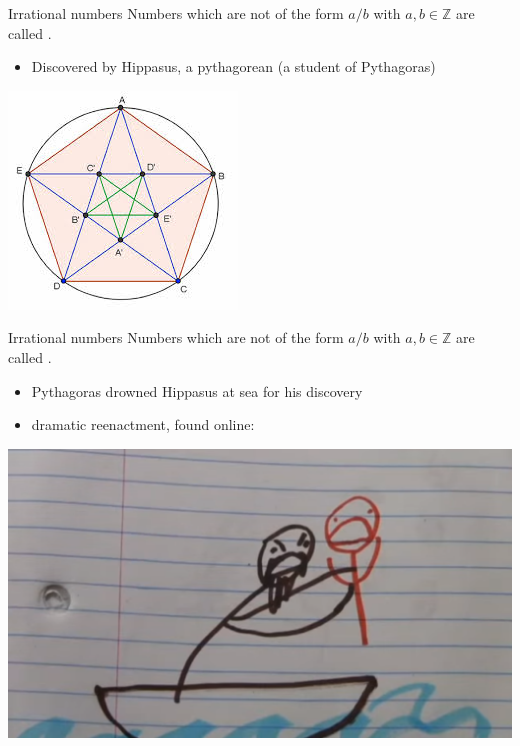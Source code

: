 \documentclass{beamer}
\begin{document}
\begin{frame}{Irrational numbers}
Numbers which are not of the form $a/b$ with $a,b\in\mathbb{Z}$ are called .\\
\begin{itemize}
\item Discovered by Hippasus, a pythagorean (a student of Pythagoras)
\end{itemize}
\begin{center}
\includegraphics[width=0.4\linewidth]{fig/pentagram}
\end{center}
\end{frame}

\begin{frame}{Irrational numbers}
Numbers which are not of the form $a/b$ with $a,b\in\mathbb{Z}$ are called .\\
\begin{itemize}
\item Pythagoras drowned Hippasus at sea for his discovery
\pause
\item dramatic reenactment, found online:
\pause
\end{itemize}
\pause
\begin{center}
\includegraphics[width=0.6\linewidth]{fig/hippasus-death}
\end{center}
\end{frame}
\end{document}
